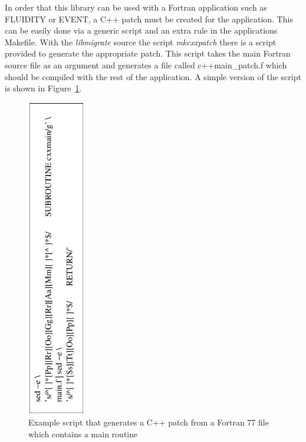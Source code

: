 \documentclass[11pt]{article}
\begin{document}
In order that this library can be used with a Fortran application such
as FLUIDITY or EVENT, a C++ patch must be created for the application.
This can be easily done via a generic script and an extra rule in the
applications Makefile. With the {\it libmigrate} source the script
{\it mkcxxpatch} there is a script
provided to generate the appropriate patch. This script
takes the main Fortran source file as an argument and generates a file
called c++main\_patch.f which should be compiled with the rest of the
application. A simple version of the script is shown in Figure~\ref{fig:mkcxxpatch}.
\begin{figure}[h]\label{fig:mkcxxpatch}
\centering
\includegraphics[height=140mm, angle=-90]{images/mkcxxpatch}
\caption{Example script that generates a C++ patch from a Fortran 77
file which contains a main routine}
\end{figure} 
\end{document}
